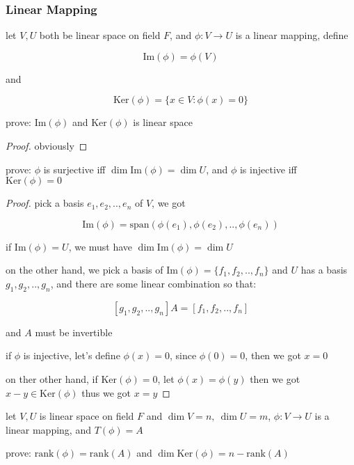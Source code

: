 \subsubsection{Linear Mapping}

\begin{exercise}
let $V, U$ both be linear space on field $F$, and $\phi: V \to U$ is a linear mapping, define

\[
    \mathrm{Im}(\phi) = \phi(V)
\]

and

\[
    \mathrm{Ker}(\phi) = \{x \in V: \phi(x) = 0\}
\]

prove: $\mathrm{Im}(\phi)$ and $\mathrm{Ker}(\phi)$ is linear space
\end{exercise}

\begin{proof}
    obviously
\end{proof}

\begin{exercise}
    prove: $\phi$ is surjective iff $\dim \mathrm{Im}(\phi) = \dim U$, and $\phi$ is injective iff $\mathrm{Ker}(\phi) = 0$
\end{exercise}

\begin{proof}
    pick a basis $e_1, e_2, .., e_n$ of $V$, we got

    \[
        \mathrm{Im}(\phi) = \mathrm{span}(\phi(e_1), \phi(e_2), .., \phi(e_n))
    \]

    if $\mathrm{Im}(\phi) = U$, we must have $\dim \mathrm{Im}(\phi) = \dim U$
    
    on the other hand, we pick a basis of $\mathrm{Im}(\phi)= \{ f_1,f_2,..,f_n \}$ and $U$
    has a basis $g_1,g_2,..,g_n$,  and there are some linear combination so that:

    \[
        [g_1,g_2,..,g_n]A =  [f_1,f_2,..,f_n]
    \]

    and $A$ must be invertible

    if $\phi$ is injective, let's define $\phi(x) = 0$, since $\phi(0) = 0$, then we got $x=0$
    
    on ther other hand, if $\mathrm{Ker}(\phi) = 0$, let $\phi(x) = \phi(y)$ then we got $x-y \in \mathrm{Ker}(\phi)$
    thus we got $x=y$
\end{proof}

\begin{exercise}
    let $V, U$ is linear space on field $F$ and $\dim V = n,\: \dim U = m$, $\phi: V \to U$
    is a linear mapping, and $T(\phi) = A$

    prove: $\mathrm{rank}(\phi) = \mathrm{rank}(A)$ and $\dim \mathrm{Ker}(\phi) = n - \mathrm{rank}(A)$
\end{exercise}

